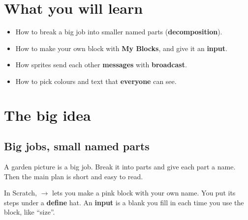
\section{What you will learn}
\begin{itemize}[leftmargin=1.2em,itemsep=1pt]
  \item How to break a big job into smaller named parts (\textbf{decomposition}).
  \item How to make your own block with \textbf{My Blocks}, and give it an \textbf{input}.
  \item How sprites send each other \textbf{messages} with \textbf{broadcast}.
  \item How to pick colours and text that \textbf{everyone} can see.
\end{itemize}

\section{The big idea}
\subsection{Big jobs, small named parts}
A garden picture is a big job. Break it into parts and give each part a name. Then the main plan is short and easy to read.

\begin{center}
\end{center}

In Scratch,  $\rightarrow$  lets you make a pink block with your own name. You put its steps under a \textbf{define} hat. An \textbf{input} is a blank you fill in each time you use the block, like \enquote{size}.

